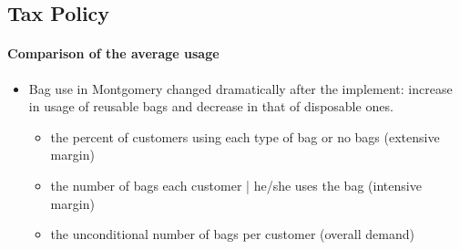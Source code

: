 \documentclass[../root]{subfiles}
\begin{document}
    \subsection{Tax Policy}

    \paragraph{Comparison of the average usage}

    \begin{itemize}
      \item Bag use in Montgomery changed dramatically after the implement: increase in usage of reusable bags and decrease in that of disposable ones.
      \begin{itemize}
        \item the percent of customers using each type of bag or no bags (extensive margin)
        \item the number of bags each customer | he/she uses the bag (intensive margin)
        \item the unconditional number of bags per customer (overall demand)
      \end{itemize}
    \end{itemize}
\end{document}
